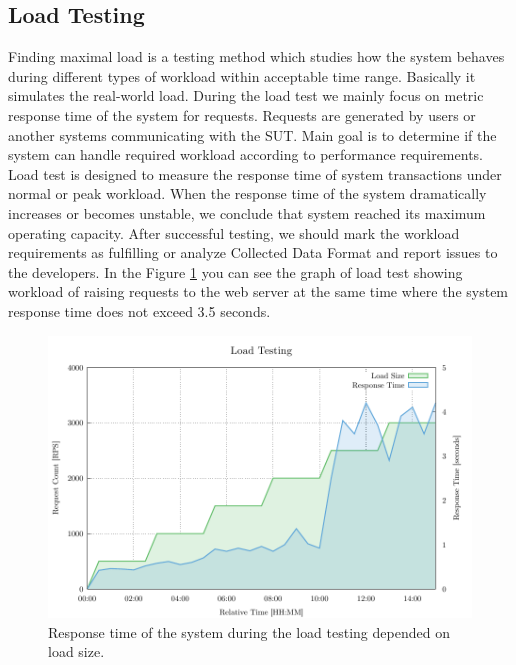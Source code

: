 \subsection*{Load Testing}
Finding maximal load is a testing method which studies how the system behaves during different types of workload within acceptable time range. Basically it simulates the real-world load. During the load test we mainly focus on metric response time of the system for requests. Requests are generated by users or another systems communicating with the SUT. Main goal is to determine if the system can handle required workload according to performance requirements. Load test is designed to measure the response time of system transactions under normal or peak workload. When the response time of the system dramatically increases or becomes unstable, we conclude that system reached its maximum operating capacity. After successful testing, we should mark the workload requirements as fulfilling or analyze Collected Data Format and report issues to the developers. In the Figure \ref{fig:load_test} you can see the graph of load test showing workload of raising requests to the web server at the same time where the system response time does not exceed 3.5 seconds.

\begin{figure}[H]
  \centering
  \includegraphics[width=15cm]{obrazky-figures/load_testing.pdf}
  \caption{Response time of the system during the load testing depended on load size.}
  \label{fig:load_test}
\end{figure}

